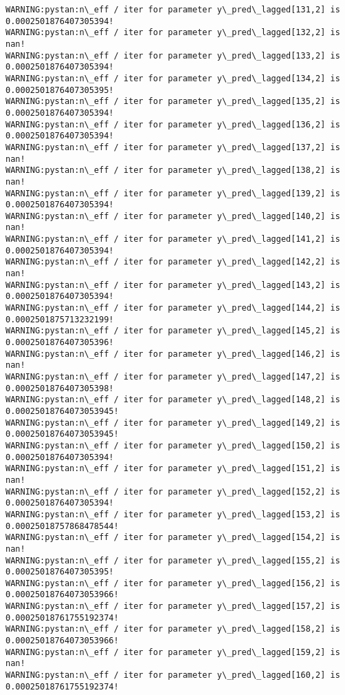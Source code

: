 \documentclass[11pt]{article}
\begin{document}
\begin{Verbatim}[commandchars=\\\{\}]
WARNING:pystan:n\_eff / iter for parameter y\_pred\_lagged[131,2] is 0.0002501876407305394!
WARNING:pystan:n\_eff / iter for parameter y\_pred\_lagged[132,2] is nan!
WARNING:pystan:n\_eff / iter for parameter y\_pred\_lagged[133,2] is 0.0002501876407305394!
WARNING:pystan:n\_eff / iter for parameter y\_pred\_lagged[134,2] is 0.0002501876407305395!
WARNING:pystan:n\_eff / iter for parameter y\_pred\_lagged[135,2] is 0.0002501876407305394!
WARNING:pystan:n\_eff / iter for parameter y\_pred\_lagged[136,2] is 0.0002501876407305394!
WARNING:pystan:n\_eff / iter for parameter y\_pred\_lagged[137,2] is nan!
WARNING:pystan:n\_eff / iter for parameter y\_pred\_lagged[138,2] is nan!
WARNING:pystan:n\_eff / iter for parameter y\_pred\_lagged[139,2] is 0.0002501876407305394!
WARNING:pystan:n\_eff / iter for parameter y\_pred\_lagged[140,2] is nan!
WARNING:pystan:n\_eff / iter for parameter y\_pred\_lagged[141,2] is 0.0002501876407305394!
WARNING:pystan:n\_eff / iter for parameter y\_pred\_lagged[142,2] is nan!
WARNING:pystan:n\_eff / iter for parameter y\_pred\_lagged[143,2] is 0.0002501876407305394!
WARNING:pystan:n\_eff / iter for parameter y\_pred\_lagged[144,2] is 0.0002501875713232199!
WARNING:pystan:n\_eff / iter for parameter y\_pred\_lagged[145,2] is 0.0002501876407305396!
WARNING:pystan:n\_eff / iter for parameter y\_pred\_lagged[146,2] is nan!
WARNING:pystan:n\_eff / iter for parameter y\_pred\_lagged[147,2] is 0.0002501876407305398!
WARNING:pystan:n\_eff / iter for parameter y\_pred\_lagged[148,2] is 0.00025018764073053945!
WARNING:pystan:n\_eff / iter for parameter y\_pred\_lagged[149,2] is 0.00025018764073053945!
WARNING:pystan:n\_eff / iter for parameter y\_pred\_lagged[150,2] is 0.0002501876407305394!
WARNING:pystan:n\_eff / iter for parameter y\_pred\_lagged[151,2] is nan!
WARNING:pystan:n\_eff / iter for parameter y\_pred\_lagged[152,2] is 0.0002501876407305394!
WARNING:pystan:n\_eff / iter for parameter y\_pred\_lagged[153,2] is 0.00025018757868478544!
WARNING:pystan:n\_eff / iter for parameter y\_pred\_lagged[154,2] is nan!
WARNING:pystan:n\_eff / iter for parameter y\_pred\_lagged[155,2] is 0.0002501876407305395!
WARNING:pystan:n\_eff / iter for parameter y\_pred\_lagged[156,2] is 0.00025018764073053966!
WARNING:pystan:n\_eff / iter for parameter y\_pred\_lagged[157,2] is 0.00025018761755192374!
WARNING:pystan:n\_eff / iter for parameter y\_pred\_lagged[158,2] is 0.00025018764073053966!
WARNING:pystan:n\_eff / iter for parameter y\_pred\_lagged[159,2] is nan!
WARNING:pystan:n\_eff / iter for parameter y\_pred\_lagged[160,2] is 0.00025018761755192374!

\end{Verbatim}
\end{document}
